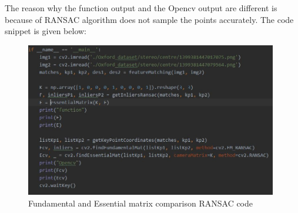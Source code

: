 \documentclass[12pt]{article}
\begin{document}
The reason why the function output and the Opencv output are different is because of RANSAC algorithm does not sample the points accurately.
The code snippet is given below:
\newpage
\begin{figure}[h]
    \centering
    \includegraphics[width=11cm]{ransac1}
    \caption{Fundamental and Essential matrix comparison RANSAC code}
    \label{fig:Fundamental and Essential matrix comparison RANSAC code}
\end{figure}
\end{document}
